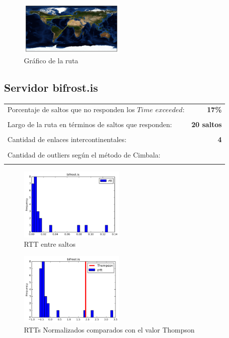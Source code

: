 \begin{figure}[H]
  \centering
    \includegraphics[width=0.45\textwidth]{grafico-rutas/www-uae-ma.png}
  \caption{Gráfico de la ruta}
  \label{entropia-s}
\end{figure}




\subsection{Servidor bifrost.is}

\begin{center}
\begin{tabular}{p{6.5cm}r}
Porcentaje de saltos que no responden los $Time$ $exceeded$: & \textbf{17\%} \\ \\ 
Largo de la ruta en términos de saltos que responden: &\textbf{20 saltos} \\ \\
Cantidad de enlaces intercontinentales: & \textbf{4} \\ \\
Cantidad de outliers según el método de Cimbala: & \textbf{} \\ \\
\end{tabular}
\end{center}

\begin{figure}[H]
  \centering
    \includegraphics[width=0.45\textwidth]{histogramas_rtt/bifrost-is.png}
  \caption{RTT entre saltos}
  \label{entropia-s}
\end{figure}

\begin{figure}[H]
  \centering
    \includegraphics[width=0.45\textwidth]{histogramas_thompson/bifrost-is.png}
  \caption{RTTs Normalizados comparados con el valor Thompson}
  \label{entropia-s}
\end{figure}

